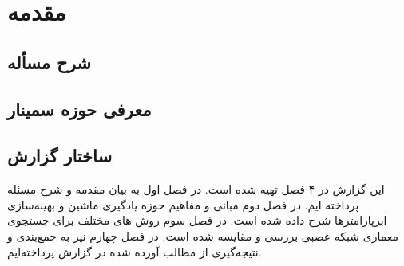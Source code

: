
\chapter{مقدمه}
\thispagestyle{empty}
\section{شرح مسأله}
\section{معرفی حوزه سمینار}

\section{ساختار گزارش}
این گزارش در ۴ فصل تهیه شده است. در فصل اول به بیان مقدمه و شرح مسئله پرداخته ایم. در فصل دوم مبانی و مفاهیم حوزه یادگیری ماشین و بهینه‌سازی ابرپارامترها شرح داده شده است. در فصل سوم روش های مختلف برای جستجوی معماری شبکه عصبی بررسی و مقایسه شده است. در فصل چهارم نیز به جمع‌بندی و نتیجه‌گیری از مطالب آورده شده در گزارش پرداخته‌ایم.
